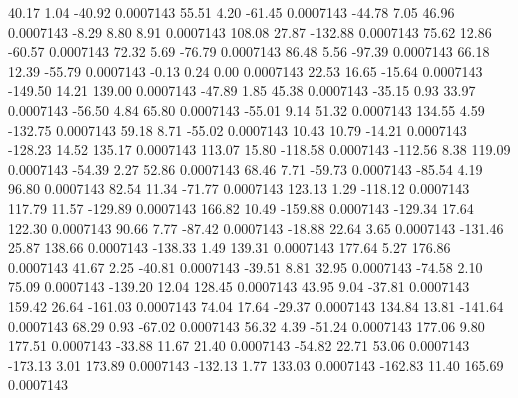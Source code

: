        40.17        1.04      -40.92     0.0007143
       55.51        4.20      -61.45     0.0007143
      -44.78        7.05       46.96     0.0007143
       -8.29        8.80        8.91     0.0007143
      108.08       27.87     -132.88     0.0007143
       75.62       12.86      -60.57     0.0007143
       72.32        5.69      -76.79     0.0007143
       86.48        5.56      -97.39     0.0007143
       66.18       12.39      -55.79     0.0007143
       -0.13        0.24        0.00     0.0007143
       22.53       16.65      -15.64     0.0007143
     -149.50       14.21      139.00     0.0007143
      -47.89        1.85       45.38     0.0007143
      -35.15        0.93       33.97     0.0007143
      -56.50        4.84       65.80     0.0007143
      -55.01        9.14       51.32     0.0007143
      134.55        4.59     -132.75     0.0007143
       59.18        8.71      -55.02     0.0007143
       10.43       10.79      -14.21     0.0007143
     -128.23       14.52      135.17     0.0007143
      113.07       15.80     -118.58     0.0007143
     -112.56        8.38      119.09     0.0007143
      -54.39        2.27       52.86     0.0007143
       68.46        7.71      -59.73     0.0007143
      -85.54        4.19       96.80     0.0007143
       82.54       11.34      -71.77     0.0007143
      123.13        1.29     -118.12     0.0007143
      117.79       11.57     -129.89     0.0007143
      166.82       10.49     -159.88     0.0007143
     -129.34       17.64      122.30     0.0007143
       90.66        7.77      -87.42     0.0007143
      -18.88       22.64        3.65     0.0007143
     -131.46       25.87      138.66     0.0007143
     -138.33        1.49      139.31     0.0007143
      177.64        5.27      176.86     0.0007143
       41.67        2.25      -40.81     0.0007143
      -39.51        8.81       32.95     0.0007143
      -74.58        2.10       75.09     0.0007143
     -139.20       12.04      128.45     0.0007143
       43.95        9.04      -37.81     0.0007143
      159.42       26.64     -161.03     0.0007143
       74.04       17.64      -29.37     0.0007143
      134.84       13.81     -141.64     0.0007143
       68.29        0.93      -67.02     0.0007143
       56.32        4.39      -51.24     0.0007143
      177.06        9.80      177.51     0.0007143
      -33.88       11.67       21.40     0.0007143
      -54.82       22.71       53.06     0.0007143
     -173.13        3.01      173.89     0.0007143
     -132.13        1.77      133.03     0.0007143
     -162.83       11.40      165.69     0.0007143
